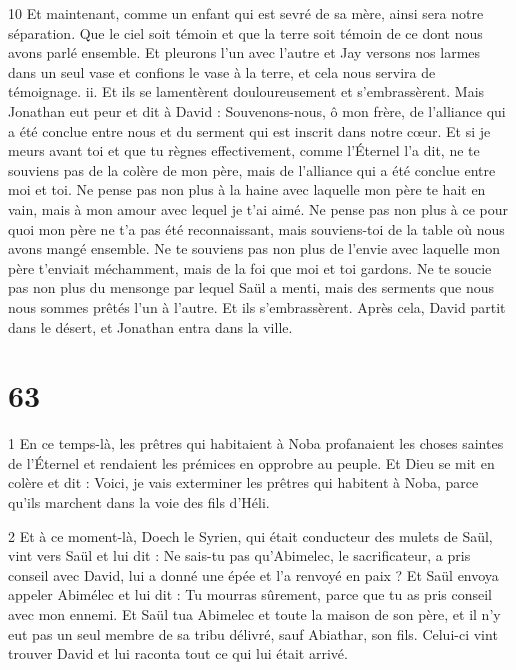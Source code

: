\par 10 Et maintenant, comme un enfant qui est sevré de sa mère, ainsi sera notre séparation. Que le ciel soit témoin et que la terre soit témoin de ce dont nous avons parlé ensemble. Et pleurons l'un avec l'autre et Jay versons nos larmes dans un seul vase et confions le vase à la terre, et cela nous servira de témoignage. ii. Et ils se lamentèrent douloureusement et s'embrassèrent. Mais Jonathan eut peur et dit à David : Souvenons-nous, ô mon frère, de l'alliance qui a été conclue entre nous et du serment qui est inscrit dans notre cœur. Et si je meurs avant toi et que tu règnes effectivement, comme l'Éternel l'a dit, ne te souviens pas de la colère de mon père, mais de l'alliance qui a été conclue entre moi et toi. Ne pense pas non plus à la haine avec laquelle mon père te hait en vain, mais à mon amour avec lequel je t'ai aimé. Ne pense pas non plus à ce pour quoi mon père ne t'a pas été reconnaissant, mais souviens-toi de la table où nous avons mangé ensemble. Ne te souviens pas non plus de l'envie avec laquelle mon père t'enviait méchamment, mais de la foi que moi et toi gardons. Ne te soucie pas non plus du mensonge par lequel Saül a menti, mais des serments que nous nous sommes prêtés l'un à l'autre. Et ils s'embrassèrent. Après cela, David partit dans le désert, et Jonathan entra dans la ville.

\chapter{63}

\par 1 En ce temps-là, les prêtres qui habitaient à Noba profanaient les choses saintes de l'Éternel et rendaient les prémices en opprobre au peuple. Et Dieu se mit en colère et dit : Voici, je vais exterminer les prêtres qui habitent à Noba, parce qu'ils marchent dans la voie des fils d'Héli.

\par 2 Et à ce moment-là, Doech le Syrien, qui était conducteur des mulets de Saül, vint vers Saül et lui dit : Ne sais-tu pas qu'Abimelec, le sacrificateur, a pris conseil avec David, lui a donné une épée et l'a renvoyé en paix ? Et Saül envoya appeler Abimélec et lui dit : Tu mourras sûrement, parce que tu as pris conseil avec mon ennemi. Et Saül tua Abimelec et toute la maison de son père, et il n'y eut pas un seul membre de sa tribu délivré, sauf Abiathar, son fils. Celui-ci vint trouver David et lui raconta tout ce qui lui était arrivé.

